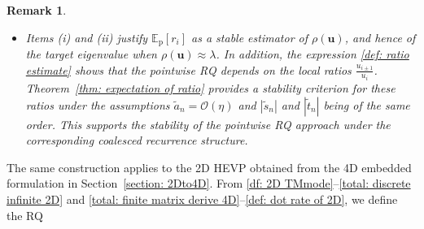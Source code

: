 \documentclass[11pt]{article}
\newtheorem{remark}[thm]{Remark}
\numberwithin{equation}{section}
\begin{document}
\begin{remark}
\begin{itemize}
    \item [(iii)]
    Items (i) and (ii) justify $\mathbb{E}_{\mathrm p}[r_i]$ as a stable estimator of $\rho(\boldsymbol{u})$, and hence of the target eigenvalue when $\rho(\boldsymbol{u})\approx\lambda$. In addition, the expression \eqref{def: ratio estimate} shows that the pointwise RQ depends on the local ratios $\frac{u_{i\pm1}}{u_i}$. Theorem~\ref{thm: expectation of ratio} provides a stability criterion for these ratios under the assumptions $\widetilde a_n=\mathcal{O}(\eta)$ and $|\widetilde s_n|$ and $|\widetilde t_n|$ being of the same order. This supports the stability of the pointwise RQ approach under the corresponding coalesced recurrence structure.
\end{itemize}

\end{remark}

The same construction applies to the 2D HEVP obtained from the 4D embedded formulation in Section~\ref{section: 2Dto4D}. From \eqref{df: 2D TMmode}--\eqref{total: discrete infinite 2D} and \eqref{total: finite matrix derive 4D}--\eqref{def: dot rate of 2D}, we define the RQ
\end{document}
